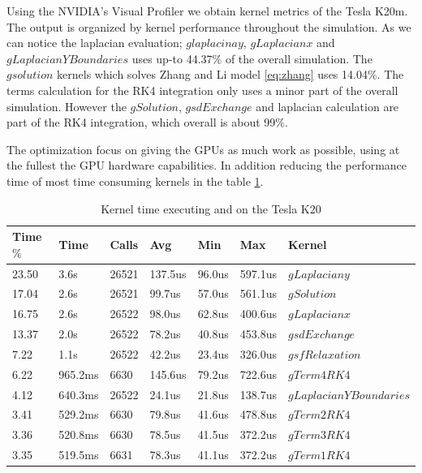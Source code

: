 Using the NVIDIA's Visual Profiler we obtain kernel metrics of the Tesla K20m. The output is organized by kernel performance throughout the  simulation.  As we can notice the laplacian evaluation; $glaplacinay$, $gLaplacianx$ and  $gLaplacianYBoundaries$ uses up-to 44.37$\%$ of the overall simulation. The $gsolution$ kernels which solves Zhang and Li model \ref{eq:zhang} uses 14.04$\%$. The terms calculation for the RK4 integration only uses a minor part of the overall simulation. However the $gSolution$, $gsdExchange$ and laplacian calculation are part of the RK4 integration, which overall is about 99$\%$.

 The optimization focus on giving the GPUs as much work as possible, using at the fullest the GPU hardware capabilities. In addition reducing the performance time of most time consuming kernels in the table \ref{tab:nvprof}.
\begin{table}[h]
\centering
  \begin{tabular} { | l | l | l | l | l | l | l |}
    \hline
    Time$\%$& Time & Calls & Avg & Min & Max & Kernel \\
    \hline
    23.50 & 3.6s & 26521 & 137.5us & 96.0us & 597.1us&$gLaplaciany$ \\
    \hline
    17.04 & 2.6s & 26521 & 99.7us & 57.0us & 561.1us&$gSolution$ \\
    \hline
    16.75 & 2.6s & 26522 & 98.0us & 62.8us & 400.6us&$gLaplacianx$ \\
     \hline
      13.37 & 2.0s & 26522 & 78.2us & 40.8us & 453.8us&$gsdExchange$\\
      \hline
    7.22 & 1.1s & 26522 & 42.2us & 23.4us & 326.0us &$gsfRelaxation$\\
       \hline
    6.22 & 965.2ms & 6630 & 145.6us & 79.2us & 722.6us &$gTerm4RK4$\\
       \hline
    4.12 & 640.3ms & 26522 & 24.1us & 21.8us  &138.7us &$gLaplacianYBoundaries$\\
       \hline
    3.41  & 529.2ms & 6630 & 79.8us & 41.6us  & 478.8us & $gTerm2RK4$\\
       \hline
    3.36 & 520.8ms & 6630 & 78.5us & 41.5us & 372.2us & $gTerm3RK4$\\
       \hline
    3.35 & 519.5ms & 6631 & 78.3us & 41.1us & 372.2us & $gTerm1RK4$ \\
   \hline
  \end{tabular}
  \caption{Kernel time executing and on the Tesla K20}
  \label{tab:nvprof}
  \end{table}
 
